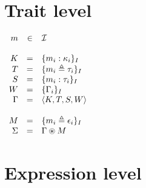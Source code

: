 \documentclass{article}[11pt]
\begin{document}
    \section{Trait level}\label{sec:trait-level}

    \begin{math}
        \begin{array}{rclp{5cm}}
            m      & \in & {\cal I}                          \\
            \\
            K       & =   & \{ m_i : \kappa_i \}_I            \\
            T       & =   & \{ m_i \triangleq \tau_i \}_I     \\
            S       & =   & \{ m_i : \tau_i \}_I              \\
            W       & =   & \{ \Gamma_i \}_I                  \\
            \Gamma  & =   & \langle K, T, S, W \rangle        \\
            \\
            M       & =   & \{ m_i \triangleq \epsilon_i \}_I \\
            \Sigma  & =   & \Gamma \circledast M
        \end{array}
    \end{math}


    \section{Expression level}\label{sec:expression-level}
\end{document}

